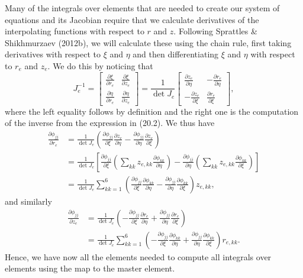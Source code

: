 \documentclass{article}
\begin{document}
Many of the integrals over elements that are needed to create our system of equations and its Jacobian require that we calculate derivatives of the interpolating functions with respect to \(r\) and \(z\). Following Sprattles \& Shikhmurzaev (2012b), we will calculate these using the chain rule, first taking derivatives with respect to \(\xi\) and \(\eta\) and then differentiating \(\xi\) and \(\eta\) with respect to \(r_e\) and \(z_e\). We do this by noticing that
\begin{equation}
J_e^{-1} = \begin{bmatrix}
\frac{\partial \xi}{\partial r_e} & \frac{\partial \xi}{\partial z_e} \\[4pt]
\frac{\partial \eta}{\partial r_e} & \frac{\partial \eta}{\partial z_e}
\end{bmatrix} = \frac{1}{\det J_e} \begin{bmatrix}
\frac{\partial z_e}{\partial \eta} & -\frac{\partial r_e}{\partial \eta} \\[4pt]
-\frac{\partial z_e}{\partial \xi} & \frac{\partial r_e}{\partial \xi}
\end{bmatrix}, \tag{20.7}
\end{equation}
where the left equality follows by definition and the right one is the computation of the inverse from the expression in (20.2). We thus have
\begin{align}
\frac{\partial \phi_{jj}}{\partial r_e} &= \frac{1}{\det J_e} \left( \frac{\partial \phi_{jj}}{\partial \xi} \frac{\partial z_e}{\partial \eta} - \frac{\partial \phi_{jj}}{\partial \eta} \frac{\partial z_e}{\partial \xi} \right) \nonumber\\
&= \frac{1}{\det J_e} \left[ \frac{\partial \phi_{jj}}{\partial \xi} \left( \sum_{kk} z_{e,kk} \frac{\partial \phi_{kk}}{\partial \eta} \right) - \frac{\partial \phi_{jj}}{\partial \eta} \left( \sum_{kk} z_{e,kk} \frac{\partial \phi_{kk}}{\partial \xi} \right) \right] \nonumber\\
&= \frac{1}{\det J_e} \sum_{kk=1}^6 \left( \frac{\partial \phi_{jj}}{\partial \xi} \frac{\partial \phi_{kk}}{\partial \eta} - \frac{\partial \phi_{jj}}{\partial \eta} \frac{\partial \phi_{kk}}{\partial \xi} \right) z_{e,kk}, \tag{20.11}
\end{align}
and similarly
\begin{align}
\frac{\partial \phi_{jj}}{\partial z_e} &= \frac{1}{\det J_e} \left( -\frac{\partial \phi_{jj}}{\partial \xi} \frac{\partial r_e}{\partial \eta} + \frac{\partial \phi_{jj}}{\partial \eta} \frac{\partial r_e}{\partial \xi} \right) \nonumber\\
&= \frac{1}{\det J_e} \sum_{kk=1}^6 \left( -\frac{\partial \phi_{jj}}{\partial \xi} \frac{\partial \phi_{kk}}{\partial \eta} + \frac{\partial \phi_{jj}}{\partial \eta} \frac{\partial \phi_{kk}}{\partial \xi} \right) r_{e,kk}. \tag{20.15}
\end{align}
Hence, we have now all the elements needed to compute all integrals over elements using the map to the master element.
\end{document}
